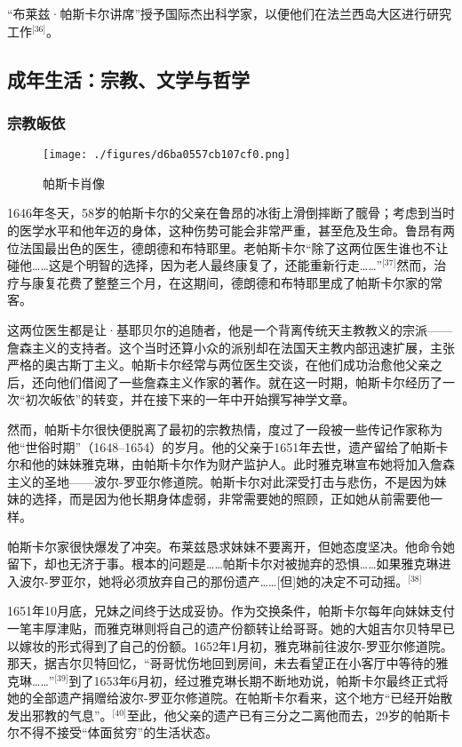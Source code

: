 “布莱兹·帕斯卡尔讲席”授予国际杰出科学家，以便他们在法兰西岛大区进行研究工作\(^\text{[36]}\)。
\subsection{成年生活：宗教、文学与哲学}
\subsubsection{宗教皈依}
\begin{figure}[ht]
\centering
\texttt{[image: ./figures/d6ba0557cb107cf0.png]}
\caption{帕斯卡肖像} \label{fig_BLSpsk_7}
\end{figure}
1646年冬天，58岁的帕斯卡尔的父亲在鲁昂的冰街上滑倒摔断了髋骨；考虑到当时的医学水平和他年迈的身体，这种伤势可能会非常严重，甚至危及生命。鲁昂有两位法国最出色的医生，德朗德和布特耶里。老帕斯卡尔“除了这两位医生谁也不让碰他……这是个明智的选择，因为老人最终康复了，还能重新行走……”\(^\text{[37]}\)然而，治疗与康复花费了整整三个月，在这期间，德朗德和布特耶里成了帕斯卡尔家的常客。

这两位医生都是让·基耶贝尔的追随者，他是一个背离传统天主教教义的宗派——詹森主义的支持者。这个当时还算小众的派别却在法国天主教内部迅速扩展，主张严格的奥古斯丁主义。帕斯卡尔经常与两位医生交谈，在他们成功治愈他父亲之后，还向他们借阅了一些詹森主义作家的著作。就在这一时期，帕斯卡尔经历了一次“初次皈依”的转变，并在接下来的一年中开始撰写神学文章。

然而，帕斯卡尔很快便脱离了最初的宗教热情，度过了一段被一些传记作家称为他“世俗时期”（1648–1654）的岁月。他的父亲于1651年去世，遗产留给了帕斯卡尔和他的妹妹雅克琳，由帕斯卡尔作为财产监护人。此时雅克琳宣布她将加入詹森主义的圣地——波尔-罗亚尔修道院。帕斯卡尔对此深受打击与悲伤，不是因为妹妹的选择，而是因为他长期身体虚弱，非常需要她的照顾，正如她从前需要他一样。

帕斯卡尔家很快爆发了冲突。布莱兹恳求妹妹不要离开，但她态度坚决。他命令她留下，却也无济于事。根本的问题是……帕斯卡尔对被抛弃的恐惧……如果雅克琳进入波尔-罗亚尔，她将必须放弃自己的那份遗产……[但]她的决定不可动摇。\(^\text{[38]}\)

1651年10月底，兄妹之间终于达成妥协。作为交换条件，帕斯卡尔每年向妹妹支付一笔丰厚津贴，而雅克琳则将自己的遗产份额转让给哥哥。她的大姐吉尔贝特早已以嫁妆的形式得到了自己的份额。1652年1月初，雅克琳前往波尔-罗亚尔修道院。那天，据吉尔贝特回忆，“哥哥忧伤地回到房间，未去看望正在小客厅中等待的雅克琳……”\(^\text{[39]}\)到了1653年6月初，经过雅克琳长期不断地劝说，帕斯卡尔最终正式将她的全部遗产捐赠给波尔-罗亚尔修道院。在帕斯卡尔看来，这个地方“已经开始散发出邪教的气息”。\(^\text{[40]}\)至此，他父亲的遗产已有三分之二离他而去，29岁的帕斯卡尔不得不接受“体面贫穷”的生活状态。

